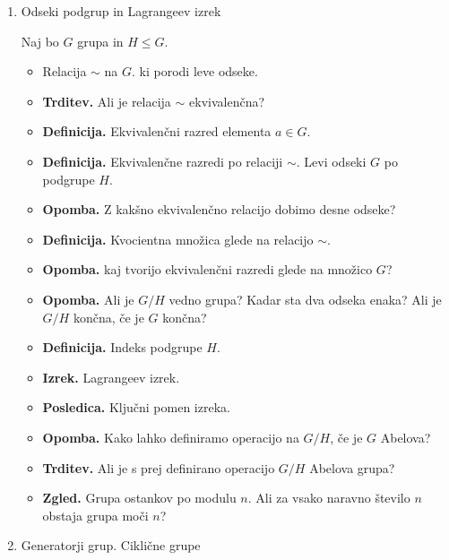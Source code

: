\begin{enumerate}
    \item Odseki podgrup in Lagrangeev izrek
    
    Naj bo \(G\) grupa in \(H \leq G\).
    \begin{itemize}
        \item Relacija \(\sim\) na \(G\). ki porodi leve odseke.
        \item \textbf{Trditev.} Ali je relacija \(\sim\) ekvivalenčna?
        \item \textbf{Definicija.} Ekvivalenčni razred elementa \(a \in G\).
        \item \textbf{Definicija.} Ekvivalenčne razredi po relaciji \(\sim\). Levi odseki \(G\) po podgrupe \(H\).
        \item \textbf{Opomba.} Z kakšno ekvivalenčno relacijo dobimo desne odseke?
        \item \textbf{Definicija.} Kvocientna množica glede na relacijo \(\sim\).
        \item \textbf{Opomba.} kaj tvorijo ekvivalenčni razredi glede na množico \(G\)?
        \item \textbf{Opomba.} Ali je \(G/H\) vedno grupa? Kadar sta dva odseka enaka? Ali je \(G/H\) končna, če je \(G\) končna?
        \item \textbf{Definicija.} Indeks podgrupe \(H\).
        \item \textbf{Izrek.} Lagrangeev izrek.
        \item \textbf{Posledica.} Ključni pomen izreka.
        \item \textbf{Opomba.} Kako lahko definiramo operacijo na \(G/H\), če je \(G\) Abelova?
        \item \textbf{Trditev.} Ali je s prej definirano operacijo \(G/H\) Abelova grupa?
        \item \textbf{Zgled.} Grupa ostankov po modulu \(n\). Ali za vsako naravno število \(n\) obstaja grupa moči \(n\)?
    \end{itemize}

    \item Generatorji grup. Ciklične grupe
    

\end{enumerate}
